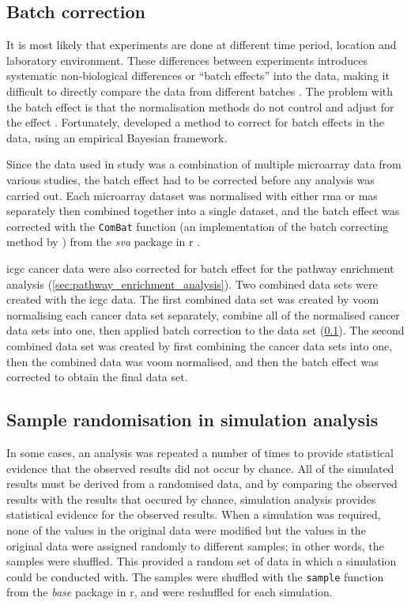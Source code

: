\subsection{Batch correction}
\label{sub:batch_correction}

It is most likely that experiments are done at different time period, location and laboratory environment.
These differences between experiments introduces systematic non-biological differences or ``batch effects'' into the data, making it difficult to directly compare the data from different batches \citep{Johnson2007}.
The problem with the batch effect is that the normalisation methods do not control and adjust for the effect \citep{Johnson2007}.
Fortunately, \citet{Johnson2007} developed a method to correct for batch effects in the data, using an empirical Bayesian framework.

Since the data used in \citet{Gatza2010a} study was a combination of multiple microarray data from various studies, the batch effect had to be corrected before any analysis was carried out.
Each microarray dataset was normalised with either \gls{rma} or \Gls{mas} separately then combined together into a single dataset, and the batch effect was corrected with the \texttt{ComBat} function (an implementation of the batch correcting method by \citet{Johnson2007}) from the \textit{sva} package in \gls{r} \citep{Leek2012}.

\gls{icgc} cancer data were also corrected for batch effect for the pathway enrichment analysis (\cref{sec:pathway_enrichment_analysis}).
Two combined data sets were created with the \gls{icgc} data.
The first combined data set was created by voom normalising each cancer data set separately, combine all of the normalised cancer data sets into one, then applied batch correction to the data set (\cref{sub:batch_correction}).
The second combined data set was created by first combining the cancer data sets into one, then the combined data was voom normalised, and then the batch effect was corrected to obtain the final data set.

\subsection{Sample randomisation in simulation analysis}
\label{sub:sample_randomisation_in_simulation_analysis}

In some cases, an analysis was repeated a number of times to provide statistical evidence that the observed results did not occur by chance.
All of the simulated results must be derived from a randomised data, and by comparing the observed results with the results that occured by chance, simulation analysis provides statistical evidence for the observed results.
When a simulation was required, none of the values in the original data were modified but the values in the original data were assigned randomly to different samples; in other words, the samples were shuffled.
This provided a random set of data in which a simulation could be conducted with.
The samples were shuffled with the \texttt{sample} function from the \textit{base} package in \gls{r}, and were reshuffled for each simulation.


